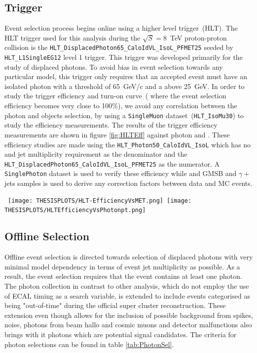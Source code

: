 \subsection{Trigger}
Event selection process begins online using a higher level trigger~(HLT). The HLT trigger used for this analysis during the $\sqrt{S} = 8$~TeV proton-proton collision is the \texttt{HLT\_DisplacedPhoton65\_CaloIdVL\_IsoL\_PFMET25} seeded by \texttt{HLT\_L1SingleEG12} level 1 trigger. This trigger was developed primarily for the study of displaced photons. To avoid bias in event selection towards any particular model, this trigger only requires that an accepted event must have an isolated photon with a \pt threshold of 65~GeV/c and a \MET above 25~GeV. In order to study the trigger efficiency and turn-on curve~( where the event selection efficiency becomes very close to 100\%), we avoid  any correlation between the photon and \MET objects selection, by using a \texttt{SingleMuon} dataset~(\texttt{HLT\_IsoMu30}) to study the efficiency measurements.
The results of the trigger efficiency measurements are shown in figure \ref{fig:HLTEff} against photon \pt and \MET. These efficiency studies are made using the \texttt{HLT\_Photon50\_CaloIdVL\_IsoL} which has no \MET and jet multiplicity requirement  as the denominator and the \newline
\texttt{HLT\_DisplacedPhoton65\_CaloIdVL\_IsoL\_PFMET25} as the numerator. A \texttt{SinglePhoton} dataset is used to verify these efficiency while and GMSB and $\gamma +$ jets samples is used to derive any correction factors between data and MC events.

\begin{center}
\centering
\mbox{
\texttt{[image: THESISPLOTS/HLT-EfficiencyVsMET.png]}
\texttt{[image: THESISPLOTS/HLTEfficiencyVsPhotonpt.png]}}
\label{fig:HLTEff}
\end{center}

\subsection{Offline Selection}
Offline event selection is directed towards selection of displaced photons with very minimal model dependency in terms of event jet multiplicity as possible. As a result, the event selection requires that the event contains at least one photon. The photon collection in contrast to other analysis, which do not employ the use of ECAL timing as a search variable, is extended to include events categorised as being "out-of-time" during the official super cluster reconstruction. These extension even though allows for the inclusion of possible background from spikes, noise, photons from beam hallo and cosmic muons and detector malfunctions also brings with it photons which are potential signal candidates.
The criteria for photon selections can be found in table \ref{tab:PhotonSel}. 

